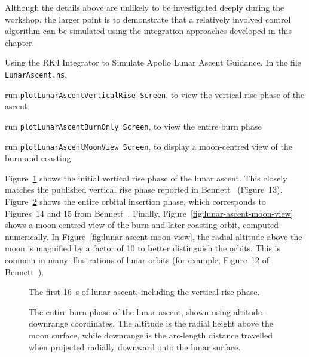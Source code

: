 \documentclass[12pt,openany]{book}
\newcommand{\filename}[1]{\texttt{#1}}  %
\newcommand{\code}[1]{\texttt{#1}}      %
\begin{document}
Although the details above are unlikely to be investigated deeply during the workshop, the larger point is to demonstrate that a relatively involved control algorithm can be simulated using the integration approaches developed in this chapter.

\begin{problem}[label=lunar-ascent-guidance]{Using the RK4 Integrator to Simulate Apollo Lunar Ascent Guidance.}
  In the file \filename{LunarAscent.hs},
  \begin{probitemize}
  \item run \code{plotLunarAscentVerticalRise Screen}, to view the vertical rise phase of the ascent
  \item run \code{plotLunarAscentBurnOnly Screen}, to view the entire burn phase
  \item run \code{plotLunarAscentMoonView Screen}, to display a moon-centred view of the burn and coasting 
  \end{probitemize}
\end{problem}

Figure~\ref{fig:lunar-ascent-vertical-rise} shows the initial vertical rise phase of the lunar ascent. This closely matches the published vertical rise phase reported in Bennett~\cite{bennett1970} (Figure~13). Figure~\ref{fig:lunar-ascent-burn-only} shows the entire orbital insertion phase, which corresponds to Figures~14 and 15 from Bennett~\cite{bennett1970}. Finally, Figure~\ref{fig:lunar-ascent-moon-view} shows a moon-centred view of the burn and later coasting orbit, computed numerically. In Figure~\ref{fig:lunar-ascent-moon-view}, the radial altitude above the moon is magnified by a factor of 10 to better distinguish the orbits. This is common in many illustrations of lunar orbits (for example, Figure~12 of Bennett~\cite{bennett1970}).

\begin{figure}[htbp]
  \resizebox{\textwidth}{!}{}
  \caption{The first \SI{16}{\s} of lunar ascent, including the vertical rise phase.}
  \label{fig:lunar-ascent-vertical-rise}
\end{figure}

\begin{figure}[htbp]
  \resizebox{\textwidth}{!}{}
  \caption{The entire burn phase of the lunar ascent, shown using altitude-downrange coordinates. The altitude is the radial height above the moon surface, while downrange is the arc-length distance travelled when projected radially downward onto the lunar surface.}
  \label{fig:lunar-ascent-burn-only}
\end{figure}
\end{document}

